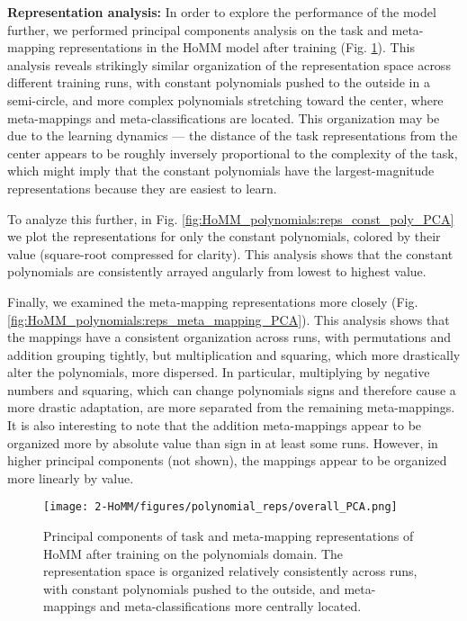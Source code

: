 \textbf{Representation analysis:} In order to explore the performance of the model further, we performed principal components analysis on the task and meta-mapping representations in the HoMM model after training (Fig. \ref{fig:HoMM_polynomials:reps_overall_PCA}). This analysis reveals strikingly similar organization of the representation space across different training runs, with constant polynomials pushed to the outside in a semi-circle, and more complex polynomials stretching toward the center, where meta-mappings and meta-classifications are located. This organization may be due to the learning dynamics --- the distance of the task representations from the center appears to be roughly inversely proportional to the complexity of the task, which might imply that the constant polynomials have the largest-magnitude representations because they are easiest to learn. 

To analyze this further, in Fig. \ref{fig:HoMM_polynomials:reps_const_poly_PCA} we plot the representations for only the constant polynomials, colored by their value (square-root compressed for clarity). This analysis shows that the constant polynomials are consistently arrayed angularly from lowest to highest value.

Finally, we examined the meta-mapping representations more closely (Fig. \ref{fig:HoMM_polynomials:reps_meta_mapping_PCA}). This analysis shows that the mappings have a consistent organization across runs, with permutations and addition grouping tightly, but multiplication and squaring, which more drastically alter the polynomials, more dispersed. In particular, multiplying by negative numbers and squaring, which can change polynomials signs and therefore cause a more drastic adaptation, are more separated from the remaining meta-mappings. It is also interesting to note that the addition meta-mappings appear to be organized more by absolute value than sign in at least some runs. However, in higher principal components (not shown), the mappings appear to be organized more linearly by value.  

\begin{figure}[ptbh]
\centering
\texttt{[image: 2-HoMM/figures/polynomial\_reps/overall\_PCA.png]}
\caption[Principal components of task and meta-mapping representations of HoMM after training on the polynomials domain.]{Principal components of task and meta-mapping representations of HoMM after training on the polynomials domain. The representation space is organized relatively consistently across runs, with constant polynomials pushed to the outside, and meta-mappings and meta-classifications more centrally located.} \label{fig:HoMM_polynomials:reps_overall_PCA}
\end{figure}

